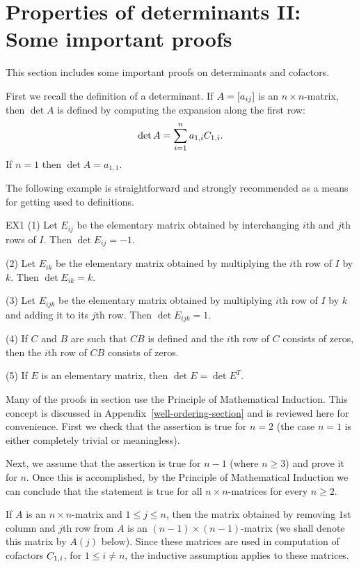\section{Properties of determinants II: Some important proofs}
\label{sec:determinant-proofs}

This section includes some important proofs on determinants and
cofactors.

First we recall the definition of a determinant. If $A=\mat{a_{ij} }$
is an $n\times n$-matrix, then $\det A$ is defined by computing the
expansion along the first row:
\begin{equation}
  \label{E1}
  \det A=\sum_{i=1}^n a_{1,i} \cof{A}{1,i}.
\end{equation}
If $n=1$ then $\det A=a_{1,1}$.

The following example is straightforward and strongly recommended as a
means for getting used to definitions.

\begin{example}{}{EX1}
  (1) Let $E_{ij}$ be the elementary matrix obtained by interchanging
  $i$th and $j$th rows of $I$.  Then $\det E_{ij}=-1$.

  (2) Let $E_{ik}$ be the elementary matrix obtained by multiplying
  the $i$th row of $I$ by $k$.  Then $\det E_{ik}=k$.

  (3) Let $E_{ijk}$ be the elementary matrix obtained by multiplying
  $i$th row of $I$ by $k$ and adding it to its $j$th row. Then
  $\det E_{ijk}=1$.

  (4) If $C$ and $B$ are such that $CB$ is defined and the $i$th row
  of $C$ consists of zeros, then the $i$th row of $CB$ consists of
  zeros.

  (5) If $E$ is an elementary matrix, then $\det E=\det E^T$.
\end{example}

Many of the proofs in section use the Principle of Mathematical
Induction. This concept is discussed in
Appendix~\ref{well-ordering-section} and is reviewed here for
convenience.  First we check that the assertion is true for $n=2$ (the
case $n=1$ is either completely trivial or meaningless).

Next, we assume that the assertion is true for $n-1$ (where $n\geq 3$)
and prove it for $n$.  Once this is accomplished, by the Principle of
Mathematical Induction we can conclude that the statement is true for
all $n\times n$-matrices for every $n\geq 2$.

If $A$ is an $n\times n$-matrix and $1\leq j \leq n$, then the matrix
obtained by removing $1$st column and $j$th row from $A$ is an
$(n-1)\times (n-1)$-matrix (we shall denote this matrix by $A(j)$
below). Since these matrices are used in computation of cofactors
$\cof{A}{1,i}$, for $1\leq i\neq n$, the inductive assumption applies
to these matrices.

